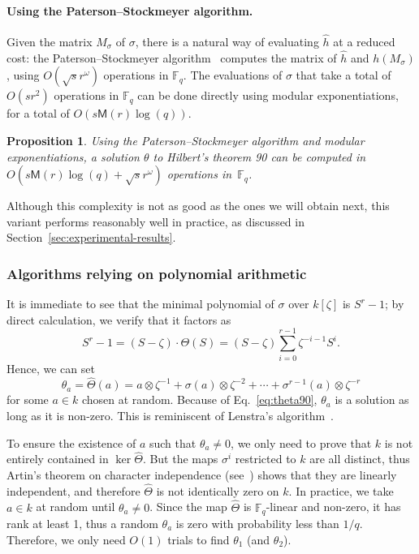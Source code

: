 \documentclass{mcom-l}
\theoremstyle{plain}
\newtheorem{proposition}[theorem]{Proposition}
\theoremstyle{definition}
\newcommand{\F}{\ensuremath{\mathbb{F}}}
\newcommand{\MM}{\ensuremath{\mathsf{M}}}
\newcounter{algorithm}
\begin{document}
\paragraph{\bf Using the Paterson--Stockmeyer algorithm.}
Given the matrix $M_\sigma$ of $\sigma$, there is a natural way of evaluating
$\hat{h}$ at a reduced cost: the Paterson--Stockmeyer
algorithm~\cite{paterson_stockmeyer} computes the matrix of $\hat h$
and $h(M_\sigma)$, using $O(\sqrt{s} r^\omega)$ operations in
$\F_q$. The evaluations of $\sigma$ that take a total of $O(s r^2)$
operations in $\F_q$ can be done directly using modular
exponentiations, for a total of $O(s \MM(r) \log(q))$.

\begin{proposition}
Using the Paterson--Stockmeyer algorithm and modular exponentiations,
a solution $\theta$ to Hilbert's theorem 90 can be computed in
$O(s \MM(r) \log(q) + \sqrt{s} r^\omega)$ operations in~$\F_q$.
\end{proposition}

Although this complexity is not as good as the ones we will obtain
next, this variant performs reasonably well in practice, as discussed
in Section~\ref{sec:experimental-results}.

\subsubsection{Algorithms relying on polynomial arithmetic}
\label{sec:algor-rely-polyn}

It is immediate to see that the minimal polynomial of $\sigma$ over $k[\zeta]$ is
$S^r-1$; by direct calculation, we verify that it
factors as
\begin{equation}
  \label{eq:theta90}
  S^r-1 = (S-\zeta)\cdot\Theta(S) =
  (S-\zeta)\sum_{i=0}^{r-1} \zeta^{-i-1}S^i. 
\end{equation}
Hence, we can set
\begin{equation}
  \label{eq:thetaa}
  \theta_a = \hat\Theta(a)
  =  a\otimes\zeta^{-1} + \sigma(a)\otimes\zeta^{-2} + \cdots + \sigma^{r-1}(a)\otimes\zeta^{-r}
\end{equation}
for some $a\in k$ chosen at random. %
Because of Eq.~\eqref{eq:theta90}, $\theta_a$ is a solution as long as
it is non-zero. %
This is reminiscent of Lenstra's algorithm~\cite[Th.~5.2]{LenstraJr91}.

To ensure the existence of $a$ such that $\theta_a\ne0$, we only need
to prove that $k$ is not entirely contained in $\ker\hat\Theta$. %
But the maps $\sigma^i$ restricted to $k$ are all distinct, thus
Artin's theorem on character independence (see~\cite[Ch~VI, Theorem~4.1]{lang})
shows that they are linearly 
independent, and therefore $\hat\Theta$ is not identically zero on $k$.
In practice, we take $a \in k$ at random until
$\theta_a\ne0$. Since the map $\hat\Theta$ is
$\F_q$-linear and non-zero, it has rank at least 1, thus a
random $\theta_a$ is zero with probability less than $1 / q$. Therefore, we only 
need $O(1)$ trials to find $\theta_1$ (and $\theta_2$).
\end{document}
